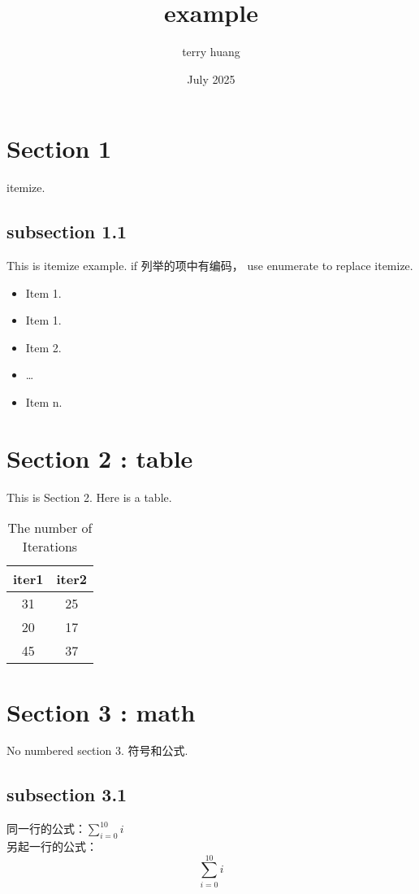 \documentclass{ctexart}
\title{example}
\author{terry huang}
\date{July 2025}
\begin{document}
\maketitle
\tableofcontents

\newpage
\section{Section 1}
itemize.
\subsection{subsection 1.1}
This is itemize example.
if 列举的项中有编码， use enumerate to replace itemize.
\begin{itemize}
    \item Item 1.
    \item Item 1. 
    \item Item 2.
    \item \ldots 
    \item Item n. 
\end{itemize}

\section{Section 2 : table}
This is Section 2.
Here is a table.
\begin{table}
    \caption{The number of Iterations}
    \centering

    \begin{tabular}{c|c}
    \hline
    iter1 & iter2\\
    \hline
    31 & 25 \\
    20 & 17 \\
    45 & 37 \\
    \hline
    \end{tabular}
    \label{tab:my_label}
\end{table}



\section{Section 3 : math}
No numbered section 3.
符号和公式.
\subsection{subsection 3.1}
同一行的公式：$\sum_{i=0}^{10}i$\\
另起一行的公式：$$\sum_{i=0}^{10}i$$
\end{document}
